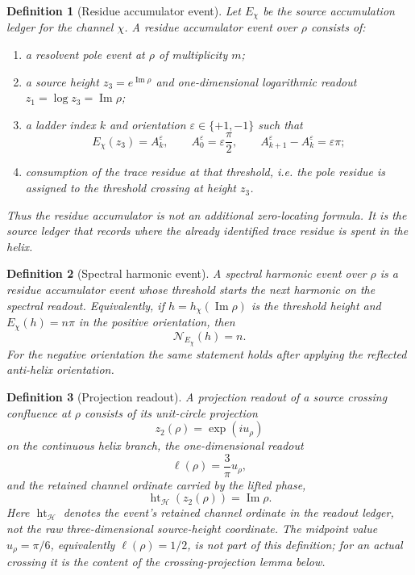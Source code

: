 \documentclass[11pt]{article}
\newtheorem{definition}{Definition}[section]
\DeclareMathOperator{\Imm}{Im}
\DeclareMathOperator{\hgt}{ht}
\begin{document}
\begin{definition}[Residue accumulator event]
Let $E_\chi$ be the source accumulation ledger for the channel $\chi$.  A
residue accumulator event over $\rho$ consists of:
\begin{enumerate}[label=(A\arabic*)]
\item a resolvent pole event at $\rho$ of multiplicity $m$;
\item a source height $z_3=e^{\Imm\rho}$ and one-dimensional logarithmic readout
  $z_1=\log z_3=\Imm\rho$;
\item a ladder index $k$ and orientation $\varepsilon\in\{+1,-1\}$ such that
\[
  E_\chi(z_3)=A_k^\varepsilon,\qquad
  A_0^\varepsilon=\varepsilon\frac{\pi}{2},\qquad
  A_{k+1}^\varepsilon-A_k^\varepsilon=\varepsilon\pi;
\]
\item consumption of the trace residue at that threshold, i.e. the pole
residue is assigned to the threshold crossing at height $z_3$.
\end{enumerate}
Thus the residue accumulator is not an additional zero-locating formula.  It
is the source ledger that records where the already identified trace residue is
spent in the helix.
\end{definition}

\begin{definition}[Spectral harmonic event]
A spectral harmonic event over $\rho$ is a residue accumulator event whose
threshold starts the next harmonic on the spectral readout.  Equivalently, if
$h=h_\chi(\Imm\rho)$ is the threshold height and $E_\chi(h)=n\pi$ in the positive
orientation, then
\[
  \mathcal N_{E_\chi}(h)=n.
\]
For the negative orientation the same statement holds after applying the
reflected anti-helix orientation.
\end{definition}

\begin{definition}[Projection readout]
A \emph{projection readout} of a source crossing confluence at $\rho$ consists of
its unit-circle projection
\[
  z_2(\rho)=\exp(iu_\rho)
\]
on the continuous helix branch, the one-dimensional readout
\[
  \ell(\rho)=\frac3\pi u_\rho,
\]
and the retained channel ordinate carried by the lifted phase,
\[
  \hgt_{\mathcal H}(z_2(\rho))=\Imm\rho .
\]
Here $\hgt_{\mathcal H}$ denotes the event's retained channel ordinate in the
readout ledger, not the raw three-dimensional source-height coordinate.  The
midpoint value $u_\rho=\pi/6$, equivalently $\ell(\rho)=1/2$, is \emph{not} part
of this definition; for an actual crossing it is the content of the
crossing-projection lemma below.
\end{definition}
\end{document}
